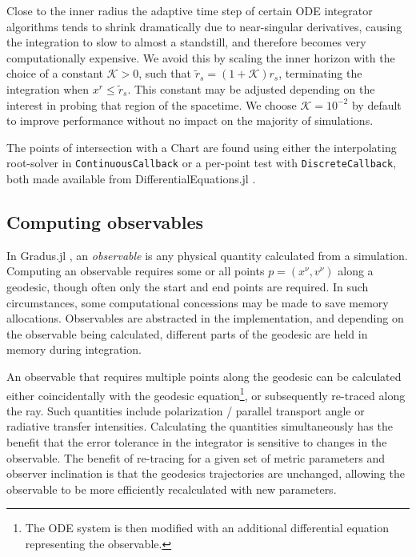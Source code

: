 \documentclass[fleqn,usenatbib]{mnras}
\newcommand{\Gradus}{Gradus.jl }
\begin{document}
Close to the inner radius the adaptive time step of certain ODE integrator
algorithms tends to shrink dramatically due to near-singular derivatives,
causing the integration to slow to almost a standstill, and therefore becomes
very computationally expensive. We avoid this by scaling the inner horizon
with the choice of a constant $\mathcal{K} > 0$, such that $\tilde{r}_s = (1 +
\mathcal{K}) r_s$, terminating the integration when $x^r \leq
\tilde{r}_s$. This constant may be adjusted depending on the interest
in probing that region of the spacetime. We choose $\mathcal{K} =
10^{-2}$ by default to improve performance without no impact on the majority of
simulations.

The points of intersection with a Chart are found using either the interpolating
root-solver in \texttt{ContinuousCallback} or a per-point test with
\texttt{DiscreteCallback}, both made available from DifferentialEquations.jl
\citep{rackauckas_differential_2017}.

\subsection{Computing observables}
\label{sec:computing-observables}

In \Gradus, an \textit{observable} is any physical quantity calculated from a
simulation. Computing an observable requires some or all points $p = (x^\nu,
v^\nu)$ along a geodesic, though often only the start and end points are
required. In such circumstances, some computational concessions may be made to
save memory allocations. Observables are abstracted in the implementation, and
depending on the observable being calculated, different parts of the geodesic
are held in memory during integration.

An observable that requires multiple points along the geodesic can be calculated
either coincidentally with the geodesic equation\footnote{The ODE system is then
modified with an additional differential equation representing the observable.},
or subsequently re-traced along the ray. Such quantities include polarization /
parallel transport angle or radiative transfer intensities. Calculating the
quantities simultaneously has the benefit that the error tolerance in the
integrator is sensitive to changes in the observable. The benefit of re-tracing
for a given set of metric parameters and observer inclination is that the
geodesics trajectories are unchanged, allowing the observable to be more
efficiently recalculated with new parameters.
\end{document}
